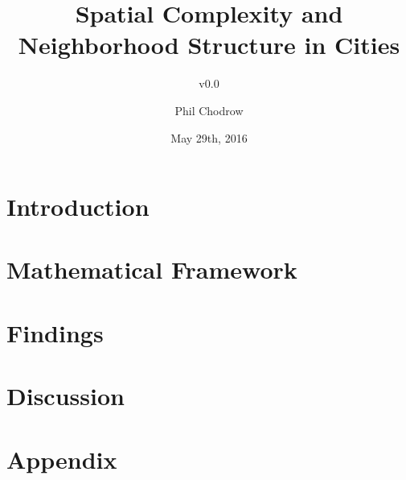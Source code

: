 \documentclass[english]{scrartcl}
\title{Spatial Complexity and Neighborhood Structure in Cities}
\subtitle{v0.0}
\author{Phil Chodrow}
\date{May 29th, 2016}
\begin{document}
\maketitle
	
\section{Introduction}
	
\section{Mathematical Framework}
	
\section{Findings}
	
\section{Discussion}
	

{}

	
\section{Appendix}
		
\end{document}
